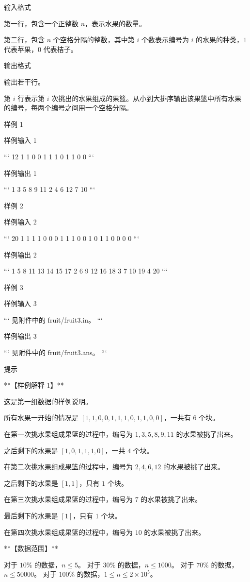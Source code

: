 \documentclass[12pt,twiside,a4paper]{ctexbook}
\numberwithin{chapter}{part}
\begin{document}
 输入格式

第一行，包含一个正整数 $n$，表示水果的数量。

第二行，包含 $n$ 个空格分隔的整数，其中第 $i$ 个数表示编号为 $i$ 的水果的种类，$1$ 代表苹果，$0$ 代表桔子。

 输出格式

输出若干行。

第 $i$ 行表示第 $i$ 次挑出的水果组成的果篮。从小到大排序输出该果篮中所有水果的编号，每两个编号之间用一个空格分隔。

 样例 1

 样例输入 1

```
12
1 1 0 0 1 1 1 0 1 1 0 0
```

 样例输出 1

```
1 3 5 8 9 11
2 4 6 12
7
10
```

 样例 2

 样例输入 2

```
20
1 1 1 1 0 0 0 1 1 1 0 0 1 0 1 1 0 0 0 0
```

 样例输出 2

```
1 5 8 11 13 14 15 17
2 6 9 12 16 18
3 7 10 19
4 20
```

 样例 3

 样例输入 3

```
见附件中的 fruit/fruit3.in。
```

 样例输出 3

```
见附件中的 fruit/fruit3.ans。
```

 提示

**【样例解释 1】**

这是第一组数据的样例说明。

所有水果一开始的情况是 $[1, 1, 0, 0, 1, 1, 1, 0, 1, 1, 0, 0]$，一共有 $6$ 个块。

在第一次挑水果组成果篮的过程中，编号为 $1, 3, 5, 8, 9, 11$ 的水果被挑了出来。

之后剩下的水果是 $[1, 0, 1, 1, 1, 0]$，一共 $4$ 个块。

在第二次挑水果组成果篮的过程中，编号为 $2, 4, 6, 12$ 的水果被挑了出来。

之后剩下的水果是 $[1, 1]$，只有 $1$ 个块。

在第三次挑水果组成果篮的过程中，编号为 $7$ 的水果被挑了出来。

最后剩下的水果是 $[1]$，只有 $1$ 个块。

在第四次挑水果组成果篮的过程中，编号为 $10$ 的水果被挑了出来。

**【数据范围】**

对于 $10 \%$ 的数据，$n \le 5$。  
对于 $30 \%$ 的数据，$n \le 1000$。  
对于 $70 \%$ 的数据，$n \le 50000$。  
对于 $100 \%$ 的数据，$1 \le n \le 2 \times {10}^5$。
\end{document}
